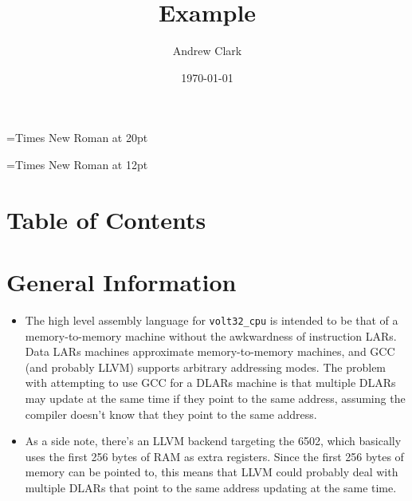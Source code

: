 \documentclass{article}
\begin{document}
	\font\titlefont={Times New Roman} at 20pt
	\title{{\titlefont Example}}

	\font\bottomtextfont={Times New Roman} at 12pt
	\date{{\bottomtextfont} \today}
	\author{{\bottomtextfont Andrew Clark}}

	\setmainfont{Times New Roman}
	\setmonofont{Courier New}

	\maketitle

	\newpage



\section{Table of Contents}
	\tableofcontents
	\newpage

\section{General Information}
	\begin{itemize}
	\item The high level assembly language for \texttt{volt32\_cpu} is
		intended to be that of a memory-to-memory machine without the
		awkwardness of instruction LARs. Data LARs machines approximate
		memory-to-memory machines, and GCC (and probably LLVM) supports
		arbitrary addressing modes. The problem with attempting to use GCC
		for a DLARs machine is that multiple DLARs may update at the same
		time if they point to the same address, assuming the compiler
		doesn't know that they point to the same address.
	\item As a side note, there's an LLVM backend targeting the 6502, which
		basically uses the first 256 bytes of RAM as extra registers. Since
		the first 256 bytes of memory can be pointed to, this means that
		LLVM could probably deal with multiple DLARs that point to the same
		address updating at the same time.
	\end{itemize}
\end{document}
